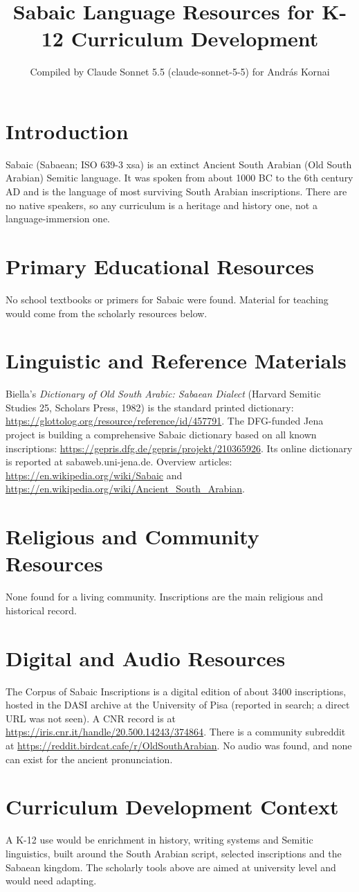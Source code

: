 \documentclass[12pt]{article}
\title{Sabaic Language Resources for K-12 Curriculum Development}
\author{Compiled by Claude Sonnet 5.5 (claude-sonnet-5-5) for Andr\'as Kornai}
\date{}
\begin{document}
\maketitle

\section{Introduction}
Sabaic (Sabaean; ISO 639-3 xsa) is an extinct Ancient South Arabian (Old South Arabian) Semitic language. It was spoken from about 1000 BC to the 6th century AD and is the language of most surviving South Arabian inscriptions. There are no native speakers, so any curriculum is a heritage and history one, not a language-immersion one.

\section{Primary Educational Resources}
No school textbooks or primers for Sabaic were found. Material for teaching would come from the scholarly resources below.

\section{Linguistic and Reference Materials}
Biella's \textit{Dictionary of Old South Arabic: Sabaean Dialect} (Harvard Semitic Studies 25, Scholars Press, 1982) is the standard printed dictionary: \url{https://glottolog.org/resource/reference/id/457791}. The DFG-funded Jena project is building a comprehensive Sabaic dictionary based on all known inscriptions: \url{https://gepris.dfg.de/gepris/projekt/210365926}. Its online dictionary is reported at sabaweb.uni-jena.de. Overview articles: \url{https://en.wikipedia.org/wiki/Sabaic} and \url{https://en.wikipedia.org/wiki/Ancient_South_Arabian}.

\section{Religious and Community Resources}
None found for a living community. Inscriptions are the main religious and historical record.

\section{Digital and Audio Resources}
The Corpus of Sabaic Inscriptions is a digital edition of about 3400 inscriptions, hosted in the DASI archive at the University of Pisa (reported in search; a direct URL was not seen). A CNR record is at \url{https://iris.cnr.it/handle/20.500.14243/374864}. There is a community subreddit at \url{https://reddit.birdcat.cafe/r/OldSouthArabian}. No audio was found, and none can exist for the ancient pronunciation.

\section{Curriculum Development Context}
A K-12 use would be enrichment in history, writing systems and Semitic linguistics, built around the South Arabian script, selected inscriptions and the Sabaean kingdom. The scholarly tools above are aimed at university level and would need adapting.
\end{document}
